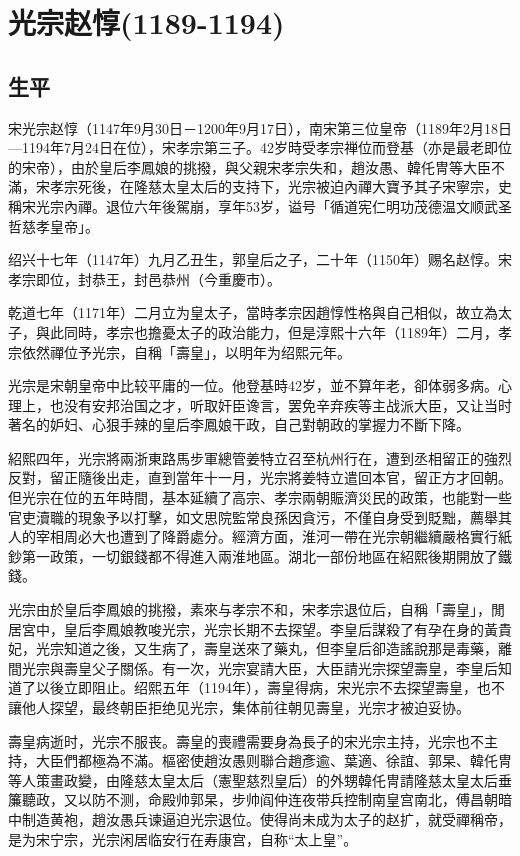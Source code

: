 
\section{光宗赵惇\tiny(1189-1194)}

\subsection{生平}

宋光宗赵惇（1147年9月30日－1200年9月17日），南宋第三位皇帝（1189年2月18日—1194年7月24日在位），宋孝宗第三子。42岁時受孝宗禅位而登基（亦是最老即位的宋帝），由於皇后李鳳娘的挑撥，與父親宋孝宗失和，趙汝愚、韓仛冑等大臣不滿，宋孝宗死後，在隆慈太皇太后的支持下，光宗被迫內禪大寶予其子宋寧宗，史稱宋光宗內禪。退位六年後駕崩，享年53岁，谥号「循道宪仁明功茂德温文顺武圣哲慈孝皇帝」。

绍兴十七年（1147年）九月乙丑生，郭皇后之子，二十年（1150年）赐名赵惇。宋孝宗即位，封恭王，封邑恭州（今重慶市）。

乾道七年（1171年）二月立为皇太子，當時孝宗因趙惇性格與自己相似，故立為太子，與此同時，孝宗也擔憂太子的政治能力，但是淳熙十六年（1189年）二月，孝宗依然禪位予光宗，自稱「壽皇」，以明年为绍熙元年。

光宗是宋朝皇帝中比较平庸的一位。他登基時42岁，並不算年老，卻体弱多病。心理上，也没有安邦治国之才，听取奸臣谗言，罢免辛弃疾等主战派大臣，又让当时著名的妒妇、心狠手辣的皇后李鳳娘干政，自己對朝政的掌握力不斷下降。

紹熙四年，光宗將兩浙東路馬步軍總管姜特立召至杭州行在，遭到丞相留正的強烈反對，留正隨後出走，直到當年十一月，光宗將姜特立遣回本官，留正方才回朝。但光宗在位的五年時間，基本延續了高宗、孝宗兩朝賑濟災民的政策，也能對一些官吏瀆職的現象予以打擊，如文思院監常良孫因貪污，不僅自身受到貶黜，薦舉其人的宰相周必大也遭到了降爵處分。經濟方面，淮河一帶在光宗朝繼續嚴格實行紙鈔第一政策，一切銀錢都不得進入兩淮地區。湖北一部份地區在紹熙後期開放了鐵錢。

光宗由於皇后李鳳娘的挑撥，素來与孝宗不和，宋孝宗退位后，自稱「壽皇」，閒居宮中，皇后李鳳娘教唆光宗，光宗长期不去探望。李皇后謀殺了有孕在身的黃貴妃，光宗知道之後，又生病了，壽皇送來了藥丸，但李皇后卻造謠說那是毒藥，離間光宗與壽皇父子關係。有一次，光宗宴請大臣，大臣請光宗探望壽皇，李皇后知道了以後立即阻止。绍熙五年（1194年），壽皇得病，宋光宗不去探望壽皇，也不讓他人探望，最终朝臣拒绝见光宗，集体前往朝见壽皇，光宗才被迫妥协。

壽皇病逝时，光宗不服丧。壽皇的喪禮需要身為長子的宋光宗主持，光宗也不主持，大臣們都極為不滿。樞密使趙汝愚则聯合趙彥逾、葉適、徐誼、郭杲、韓仛冑等人策畫政變，由隆慈太皇太后（憲聖慈烈皇后）的外甥韓仛冑請隆慈太皇太后垂簾聽政，又以防不测，命殿帅郭杲，步帅阎仲连夜带兵控制南皇宫南北，傅昌朝暗中制造黄袍，趙汝愚兵谏逼迫光宗退位。使得尚未成为太子的赵扩，就受禪稱帝，是为宋宁宗，光宗闲居临安行在寿康宫，自称“太上皇”。

